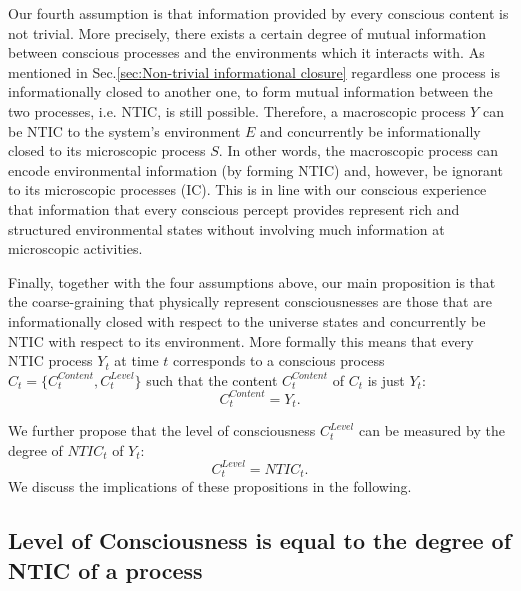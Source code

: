 \documentclass[utf8]{article}
\begin{document}
        Our fourth assumption is that information provided by every conscious content is not trivial. More precisely, there exists a certain degree of mutual information between conscious processes and the environments which it interacts with. As mentioned in Sec.\ref{sec:Non-trivial informational closure} regardless one process is informationally closed to another one, to form mutual information between the two processes, i.e. NTIC, is still possible. Therefore, a macroscopic process $Y$ can be NTIC to the system's environment $E$ and concurrently be informationally closed to its microscopic process $S$. In other words, the macroscopic process can encode environmental information (by forming NTIC) and, however, be ignorant to its microscopic processes (IC). This is in line with our conscious experience that information that every conscious percept provides represent rich and structured environmental states without involving much information at microscopic activities.
        
        Finally, together with the four assumptions above, our main proposition is that the coarse-graining that physically represent consciousnesses are those that are informationally closed with respect to the universe states and concurrently be NTIC with respect to its environment. More formally this means that every NTIC process $Y_t$ at time $t$ corresponds to a conscious process $C_t=\{C_t^{Content},C_t^{Level}\}$ such that the content $C_{t}^{Content}$ of $C_t$ is just $Y_t$:
		\begin{equation}\label{eq:cContent}
			C_{t}^{Content} = Y_{t}.
		\end{equation}
		
		
		\noindent
        We further propose that the level of consciousness $C_{t}^{Level}$ can be measured by the degree of $NTIC_{t}$ of $Y_t$:
		\begin{equation}\label{eq:cLevel}
			C_{t}^{Level} = NTIC_{t}.
		\end{equation}
		We discuss the implications of these propositions in the following. 	
		
		
	    \subsection{Level of Consciousness is equal to the degree of NTIC of a process}\label{sec:cl}
            
\end{document}
